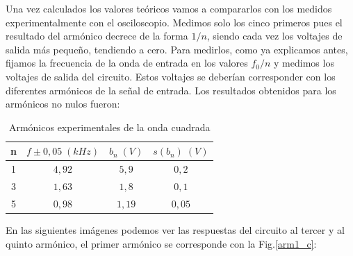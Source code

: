\documentclass[a4paper,12pt,titlepage]{article}
\begin{document}
\newpage

Una vez calculados los valores teóricos vamos a compararlos con los medidos experimentalmente con el osciloscopio. Medimos solo los cinco primeros pues el resultado del armónico decrece de la forma $1/n$, siendo cada vez los voltajes de salida más pequeño, tendiendo a cero. Para medirlos, como ya explicamos antes, fijamos la frecuencia de la onda de entrada en los valores $f_0/n$ y medimos los voltajes de salida del circuito. Estos voltajes se deberían corresponder con los diferentes armónicos de la señal de entrada. Los resultados obtenidos para los armónicos no nulos fueron:

\begin{table}[h!]
\centering
\begin{tabular}{|c|c|c|c|}
\hline
n & $f \pm 0,05 \; (kHz)$ & $b_n \;(V)$ & $s(b_n) \; (V)$ \\ \hline
1 & $4,92$ & $5,9$& $0,2$   \\ \hline
3 & $1,63$ &  $1,8$& $0,1$   \\ \hline
5 & $0,98$ &  $1,19$& $0,05$  \\ \hline
\end{tabular}
\caption{Armónicos experimentales de la onda cuadrada}
\label{tab:my-table}
\end{table}

En las siguientes imágenes podemos ver las respuestas del circuito al tercer y al quinto armónico, el primer armónico se corresponde con la Fig.\ref{arm1_c}:
\end{document}
